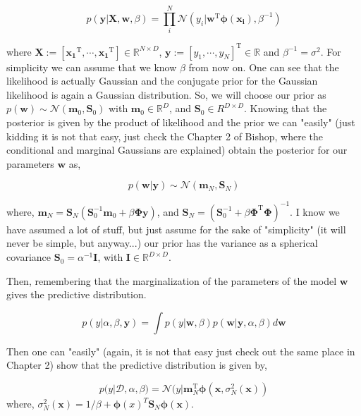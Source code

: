 \documentclass{article}
\begin{document}
\begin{equation}
  p(\mathbf{y}| \mathbf{X}, \mathbf{w}, \beta)=\prod_i^{N} \mathcal{N}(y_i|\mathbf{w}^\text{T}\boldsymbol{\phi(x_i)}, \beta^{-1})
  \label{eq:likelihood}
\end{equation}

where $\mathbf{X}:=[\mathbf{x_1}^\text{T},\cdots, \mathbf{x_1}^\text{T}] \in \mathbb{R}^{N\times D}$, $\mathbf{y}:=[y_1,\cdots, y_N]^\text{T}\in\mathbb{R}$ and $\beta^{-1}=\sigma^2$. For simplicity we can assume that we know $\beta$ from now on. One can see that the likelihood is actually Gaussian and the conjugate prior for the Gaussian likelihood is again a Gaussian distribution. So, we will choose our prior as $p(\mathbf{w})\sim\mathcal{N}(\mathbf{m}_0, \mathbf{S}_0)$ with $\mathbf{m}_0\in\mathbb{R}^D$, and $\mathbf{S}_0\in{R}^{D\times D}$. Knowing that the posterior is given by the product of likelihood and the prior we can "easily" (just kidding it is not that easy, just check the Chapter 2 of Bishop, where the conditional and marginal Gaussians are explained) obtain the posterior for our parameters $\mathbf{w}$ as,

\begin{equation}
  p(\mathbf{w}|\mathbf{y})\sim\mathcal{N}(\mathbf{m}_N, \mathbf{S}_N)
\end{equation}

where, $\mathbf{m}_N=\mathbf{S}_N(\mathbf{S}_0^{-1}\mathbf{m}_0+\beta\boldsymbol{\Phi}\mathbf{y})$, and $\mathbf{S}_N=(\mathbf{S}_0^{-1}+\beta\boldsymbol{\Phi}^\text{T}\boldsymbol{\Phi})^{-1}$.  I know we have assumed a lot of stuff, but just assume for the sake of "simplicity" (it will never be simple, but anyway...) our prior has the variance as a spherical covariance $\mathbf{S}_0=\alpha^{-1}\mathbf{I}$, with $\mathbf{I}\in\mathbb{R}^{D\times D}$.

Then, remembering that the marginalization of the parameters of the model $\mathbf{w}$ gives the predictive distribution. 

\begin{equation}
  p(y|\alpha, \beta, \mathbf{y}) = \int p(y|\mathbf{w},\beta)p(\mathbf{w}|\mathbf{y},\alpha, \beta) d\mathbf{w}
\end{equation}

Then one can "easily" (again, it is not that easy just check out the same place in Chapter 2) show that the predictive distribution is given by,

\begin{equation}
  p(y|\mathcal{D},\alpha, \beta)=\mathcal{N}(y|\mathbf{m}_N^\text{T}\boldsymbol{\phi}(\mathbf{x},\sigma_N^2(\mathbf{x}))
\end{equation}
where, $\sigma_N^2(\mathbf{x})=1/\beta+\boldsymbol{\phi}(x)^T\mathbf{S}_N\boldsymbol{\phi}(\mathbf{x})$.
\end{document}
